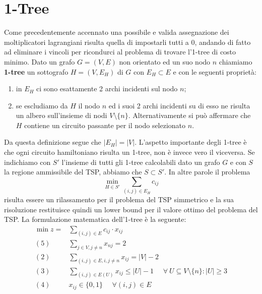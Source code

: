 \documentclass[
    article,            %
    12pt,                %
    oneside,            %
    a4paper,            %
    english,            %
    italian,                %
    sumario=tradicional,
]{abntex2}
\begin{document}
    \section{1-Tree}\label{sec:1-tree}
    Come precedentemente accennato una possibile e valida assegnazione dei moltiplicatori lagrangiani risulta quella di impostarli tutti a 0, andando di fatto ad eliminare i vincoli per ricondurci al problema di trovare l'1-tree di costo minimo.
    \newline
    Dato un grafo $G=(V,E)$ non orientato ed un suo nodo $n$ chiamiamo \textbf{1-tree} un sottografo $H = (V, E_H)$ di $G$ con $E_H \subset E$ e con le seguenti proprietà:
    \begin{enumerate}
        \item in $E_H$ ci sono esattamente 2 archi incidenti sul nodo $n$;
        \item se escludiamo da $H$ il nodo $n$ ed i suoi 2 archi incidenti su di esso ne risulta un albero sull'insieme di nodi $V \setminus \{n\}$.
        Alternativamente si può affermare che $H$ contiene un circuito passante per il nodo selezionato $n$.
    \end{enumerate}
    Da questa definizione segue che $|E_H| = |V|$.
    \newline
    L'aspetto importante degli 1-tree è che ogni circuito hamiltoniano risulta un 1-tree, non è invece vero il viceversa.
    Se indichiamo con $S'$ l'insieme di tutti gli 1-tree calcolabili dato un grafo $G$ e con $S$ la regione ammissibile del TSP, abbiamo che $S \subset S'$.
    In altre parole il problema
    \begin{equation*}
        \min_{H\in S'} \sum_{(i,j) \in E_H} c_{ij}
    \end{equation*}
    risulta essere un rilassamento per il problema del TSP simmetrico e la sua risoluzione restituisce quindi un lower bound per il valore ottimo del problema del TSP.
    \newline
    La formulazione matematica dell'1-tree è la seguente:
    \begin{equation*}
        \begin{split}
            \min z = & \sum_{(i,j) \in E} c_{ij} \cdot x_{ij}\\
            (5)\:\:\:\:\:\: & \sum_{j \in V, j \neq n} x_{nj} = 2 \\
            (2) \:\:\:\:\:\: & \sum_{(i,j)\in E, i, j \neq n} x_{ij} = |V|-2 \\
            (3) \:\:\:\:\:\: & \sum_{(i,j) \in E(U)} x_{ij} \leq |U| - 1 \:\:\:\:\:\: \forall\: U \subseteq V\setminus\{n\} : |U| \geq 3 \\
            (4) \:\:\:\:\:\: & x_{ij} \in \{0,1\} \:\:\:\:\:\: \forall (i,j) \in E\\
        \end{split}
    \end{equation*}
\end{document}
